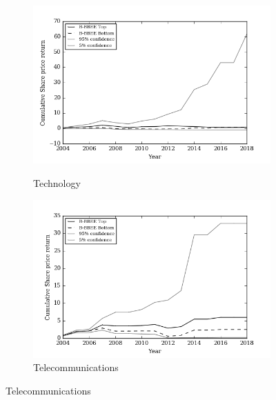 \begin{figure}[!h]
    \begin{subfigure}{\textwidth}
      \centering
      \includegraphics[width=.8\linewidth]{"Images/Bootstrap_Technology_Cumulative"}
      {\small {\it \caption{Technology}}}
    \end{subfigure}
    \begin{subfigure}{\textwidth}
      \centering
      \includegraphics[width=.8\linewidth]{"Images/Bootstrap_Telecommunications_Cumulative"}
      {\small {\caption{Telecommunications }}}
    \end{subfigure}
\end{figure}
